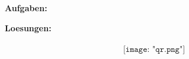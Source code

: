\documentclass{article}
\begin{document}
	
	\huge
	\textbf{Aufgaben:}\\
	\normalsize
	
	\pagebreak
	
	\huge
	\textbf{Loesungen:}\\\\
	
	\centering
	\normalsize
	\[ {\texttt{[image: "qr.png"]}} \]
	
\end{document}
